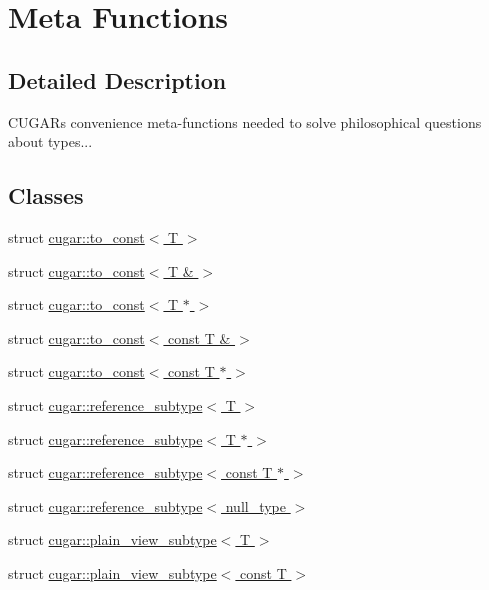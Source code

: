 \hypertarget{group___basic_meta_functions}{}\section{Meta Functions}
\label{group___basic_meta_functions}


\subsection{Detailed Description}
C\+U\+G\+AR\textquotesingle{}s convenience meta-\/functions needed to solve philosophical questions about types... \subsection*{Classes}
\begin{DoxyCompactItemize}
\item 
struct \hyperlink{structcugar_1_1to__const}{cugar\+::to\+\_\+const$<$ T $>$}
\item 
struct \hyperlink{structcugar_1_1to__const_3_01_t_01_6_01_4}{cugar\+::to\+\_\+const$<$ T \& $>$}
\item 
struct \hyperlink{structcugar_1_1to__const_3_01_t_01_5_01_4}{cugar\+::to\+\_\+const$<$ T $\ast$ $>$}
\item 
struct \hyperlink{structcugar_1_1to__const_3_01const_01_t_01_6_01_4}{cugar\+::to\+\_\+const$<$ const T \& $>$}
\item 
struct \hyperlink{structcugar_1_1to__const_3_01const_01_t_01_5_01_4}{cugar\+::to\+\_\+const$<$ const T $\ast$ $>$}
\item 
struct \hyperlink{structcugar_1_1reference__subtype}{cugar\+::reference\+\_\+subtype$<$ T $>$}
\item 
struct \hyperlink{structcugar_1_1reference__subtype_3_01_t_01_5_01_4}{cugar\+::reference\+\_\+subtype$<$ T $\ast$ $>$}
\item 
struct \hyperlink{structcugar_1_1reference__subtype_3_01const_01_t_01_5_01_4}{cugar\+::reference\+\_\+subtype$<$ const T $\ast$ $>$}
\item 
struct \hyperlink{structcugar_1_1reference__subtype_3_01null__type_01_4}{cugar\+::reference\+\_\+subtype$<$ null\+\_\+type $>$}
\item 
struct \hyperlink{structcugar_1_1plain__view__subtype}{cugar\+::plain\+\_\+view\+\_\+subtype$<$ T $>$}
\item 
struct \hyperlink{structcugar_1_1plain__view__subtype_3_01const_01_t_01_4}{cugar\+::plain\+\_\+view\+\_\+subtype$<$ const T $>$}

\end{DoxyCompactItemize}
